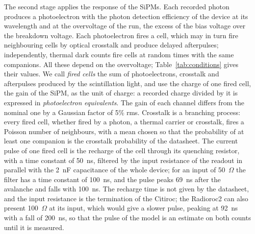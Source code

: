 \documentclass[11pt]{article}
\begin{document}
The second stage applies the response of the SiPMs. Each recorded photon
produces a photoelectron with the photon detection efficiency of the
device at its wavelength and at the overvoltage of the run, the excess of
the bias voltage over the breakdown voltage. Each photoelectron fires a
cell, which may in turn fire neighbouring cells by optical crosstalk and
produce delayed afterpulses; independently, thermal dark counts fire cells
at random times with the same companions. All these depend on the
overvoltage; Table~\ref{tab:conditions} gives their values. We call
\emph{fired cells} the sum of photoelectrons, crosstalk and afterpulses
produced by the scintillation light, and use the charge of one fired cell,
the gain of the SiPM, as the unit of charge: a recorded charge divided by
it is expressed in \emph{photoelectron equivalents}. The gain of each
channel differs from the nominal one by a Gaussian factor of 5\% rms.
Crosstalk is a branching process: every fired cell, whether fired by a
photon, a thermal carrier or crosstalk, fires a Poisson number of
neighbours, with a mean chosen so that the probability of at least one
companion is the crosstalk probability of the datasheet. The current
pulse of one fired cell is the recharge of the cell through its quenching
resistor, with a time constant of 50~ns, filtered by the input resistance
of the readout in parallel with the 2~nF capacitance of the whole device;
for an input of 50~$\Omega$ the filter has a time constant of 100~ns, and
the pulse peaks 69~ns after the avalanche and falls with 100~ns. The
recharge time is not given by the datasheet, and the input resistance is
the termination of the Citiroc; the Radioroc2 can also present
100~$\Omega$ at its input, which would give a slower pulse, peaking at
92~ns with a fall of 200~ns, so that the pulse of the model is an estimate
on both counts until it is measured.
\end{document}
